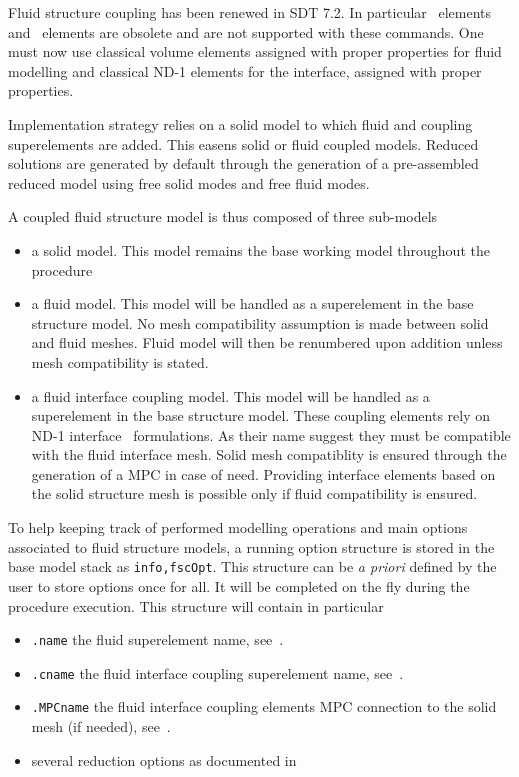 \begin{SDT}


Fluid structure coupling has been renewed in SDT 7.2. In particular \fluid\ elements and \fsc\ elements are obsolete and are not supported with these commands. One must now use classical volume elements assigned with proper \melastic properties for fluid modelling and classical ND-1 elements for the interface, assigned with proper \psolid properties.

Implementation strategy relies on a solid model to which fluid and coupling superelements are added. This easens solid or fluid coupled models. Reduced solutions are generated by default through the generation of a pre-assembled reduced model using free solid modes and free fluid modes.

A coupled fluid structure model is thus composed of three sub-models
\begin{itemize}
\item a solid model. This model remains the base working model throughout the procedure
\item a fluid model. This model will be handled as a superelement in the base structure model. No mesh compatibility assumption is made between solid and fluid meshes. Fluid model will then be renumbered upon addition unless mesh compatibility is stated.
\item a fluid interface coupling model. This model will be handled as a superelement in the base structure model. These coupling elements rely on ND-1 interface \psolid\ formulations. As their name suggest they must be compatible with the fluid interface mesh. Solid mesh compatiblity is ensured through the generation of a  MPC in case of need. Providing interface elements based on the solid structure mesh is possible only if fluid compatibility is ensured.
\end{itemize}

To help keeping track of performed modelling operations and main options associated to fluid structure models, a running option structure is stored in the base model stack as {\tt info,fscOpt}. This structure can be {\it a priori} defined by the user to store options once for all. It will be completed on the fly during the procedure execution. This structure will contain in particular
\begin{itemize}
\item {\tt .name} the fluid superelement name, see~.
\item {\tt .cname} the fluid interface coupling superelement name, see~.
\item {\tt .MPCname} the fluid interface coupling elements MPC connection to the solid mesh (if needed), see~.
\item several reduction options as documented in~
\end{itemize}


\end{SDT}
